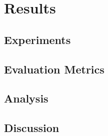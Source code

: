 
\chapter{Results}  \label{sec:results}


\section{Experiments}  \label{sec:experiments}

\section{Evaluation Metrics}  \label{sec:metrics}


\section{Analysis}  \label{sec:analysis}

\section{Discussion}  \label{sec:discussion}

